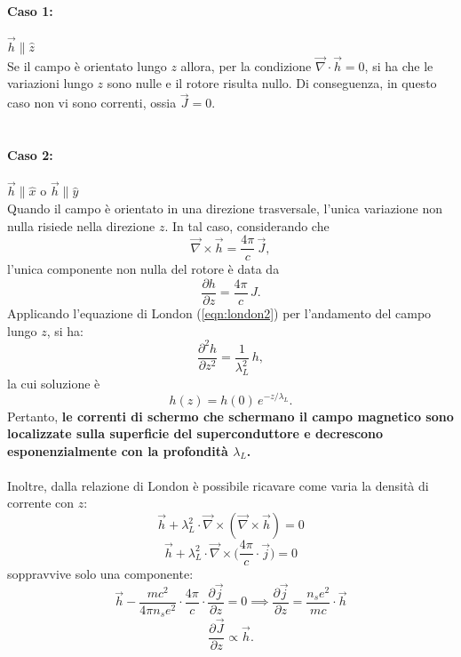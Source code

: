 \paragraph{Caso 1:} \(\vec{h} \parallel \hat{z}\) \\
Se il campo è orientato lungo \(z\) allora, per la condizione \(\vec{\nabla} \cdot \vec{h} = 0\), si ha che le variazioni lungo \(z\) sono nulle e il rotore risulta nullo. Di conseguenza, in questo caso non vi sono correnti, ossia \(\vec{J} = 0\).\\\\

\paragraph{Caso 2:} \(\vec{h} \parallel \hat{x}\) o \(\vec{h} \parallel \hat{y}\) \\
Quando il campo è orientato in una direzione trasversale, l'unica variazione non nulla risiede nella direzione \(z\). In tal caso, considerando che
\[
\vec{\nabla} \times \vec{h} = \frac{4\pi}{c}\, \vec{J},
\]
l'unica componente non nulla del rotore è data da
\[
\frac{\partial h}{\partial z} = \frac{4\pi}{c}\, J.
\]
Applicando l'equazione di London (\ref{eqn:london2}) per l'andamento del campo lungo \(z\), si ha:
\[
\frac{\partial^2 h}{\partial z^2} = \frac{1}{\lambda_L^2}\, h,
\]
la cui soluzione è
\[
h(z) = h(0)\, e^{-z/\lambda_L}.
\]
Pertanto, \textbf{le correnti di schermo che schermano il campo magnetico sono localizzate sulla superficie del superconduttore e decrescono esponenzialmente con la profondità \(\lambda_L\).}\\\\
Inoltre, dalla relazione di London è possibile ricavare come varia la densità di corrente con \(z\):
\[ \vec{h} + \lambda_L^2\cdot \vec{\nabla}\times(\vec{\nabla}\times \vec{h})=0\]
 \[ \vec{h} + \lambda_L^2\cdot \vec{\nabla}\times\biggr(\frac{4\pi}{c}\cdot \vec{j}\biggr)=0 \]
        soppravvive solo una componente:
 \[\vec{h} - \frac{mc^2}{4\pi n_s e^2}\cdot \frac{4\pi}{c}\cdot \frac{\partial \vec{j}}{\partial z} = 0 \implies \frac{\partial \vec{j}}{\partial z} = \frac{n_s e^2}{mc}\cdot \vec{h}\]
\[
\frac{\partial \vec{J}}{\partial z} \propto \vec{h}.
\]

